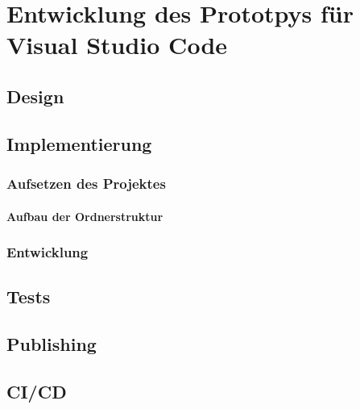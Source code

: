 \chapter{Entwicklung des Prototpys für Visual Studio Code}
\label{cha:EntwicklungVsCode}

\section{Design}
\label{sec:EntwicklungVsCode_Design}

\section{Implementierung}
\label{sec:EntwicklungVsCode_Implementierung}

\subsection{Aufsetzen des Projektes}

\subsubsection{Aufbau der Ordnerstruktur}

\subsection{Entwicklung}

\section{Tests}
\label{sec:EntwicklungVsCode_Tests}

\section{Publishing}
\label{sec:EntwicklungVsCode_Publishing}

\section{CI/CD}
\label{sec:EntwicklungVsCode_CICD}